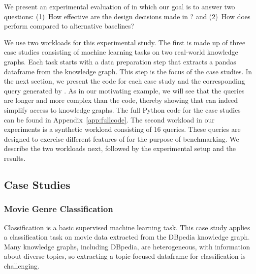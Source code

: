 
We present an experimental evaluation of \rdfframes
in which our goal is to answer two questions:
(1)~How effective are the design decisions made in \rdfframes? 
and
(2)~How does \rdfframes perform compared to alternative baselines?

We use two workloads for this experimental study.
The first is made up of three case studies consisting of   
machine learning tasks on two real-world knowledge graphs. 
Each task starts with a data preparation step that extracts a pandas dataframe from the knowledge graph.
This step is the focus of the case studies.
In the next section, we present the \rdfframes code for each case study and the corresponding \sparql query generated by \rdfframes.
As in our motivating example, we will see that the \sparql queries are longer and more complex than the \rdfframes code, thereby showing that \rdfframes can indeed simplify access to knowledge graphs.
The full Python code for the case studies can be found in Appendix~\ref{app:fullcode}.
The second workload in our experiments is a synthetic workload consisting of 16 queries.
These queries are designed to exercise different features of \rdfframes for the purpose of benchmarking.
We describe the two workloads next, followed by the experimental setup and the results.
\vspace*{-7pt}
\subsection{Case Studies}
\label{subsec:case-studies}
\vspace*{8pt}
\subsubsection{Movie Genre Classification}
\label{subsec:genreclass}

\vspace*{-10pt}
Classification is a basic supervised machine learning task. 
This case study applies a classification task on movie data extracted from the DBpedia
knowledge graph.
Many knowledge graphs, including DBpedia, are heterogeneous,
with information about diverse topics, so extracting a
topic-focused dataframe for classification is challenging.

